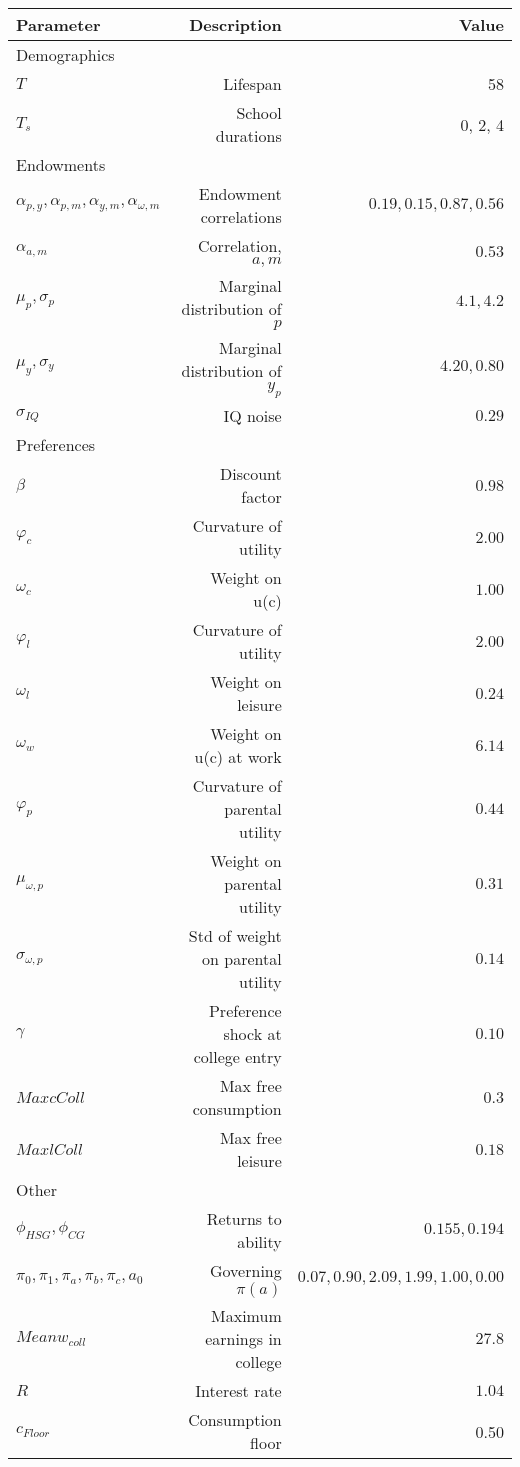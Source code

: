 \begin{tabular}{lrr}
\hline
Parameter & Description  & Value  \\
\hline
Demographics &   &   \\
$T$ & Lifespan  & 58  \\
$T_{s}$ & School durations  & 0, 2, 4  \\
Endowments &   &   \\
$\alpha_{p,y}, \alpha_{p,m}, \alpha_{y,m}, \alpha_{\omega,m}$ & Endowment correlations  & $0.19, 0.15, 0.87, 0.56$  \\
$\alpha_{a,m}$ & Correlation, $a,m$  & $0.53$  \\
$\mu_{p}, \sigma_{p}$ & Marginal distribution of $p$  & $4.1, 4.2$  \\
$\mu_{y}, \sigma_{y}$ & Marginal distribution of $y_{p}$  & $4.20, 0.80$  \\
$\sigma_{IQ}$ & IQ noise  & $0.29$  \\
Preferences &   &   \\
$\beta$ & Discount factor  & $0.98$  \\
$\varphi_{c}$ & Curvature of utility  & $2.00$  \\
$\omega_{c}$ & Weight on u(c)  & $1.00$  \\
$\varphi_{l}$ & Curvature of utility  & $2.00$  \\
$\omega_{l}$ & Weight on leisure  & $0.24$  \\
$\omega_{w}$ & Weight on u(c) at work  & $6.14$  \\
$\varphi_{p}$ & Curvature of parental utility  & $0.44$  \\
$\mu_{\omega,p}$ & Weight on parental utility  & $0.31$  \\
$\sigma_{\omega,p}$ & Std of weight on parental utility  & $0.14$  \\
$\gamma$ & Preference shock at college entry  & $0.10$  \\
$Max cColl$ & Max free consumption  & $0.3$  \\
$Max lColl$ & Max free leisure  & $0.18$  \\
Other &   &   \\
$\phi_{HSG}, \phi_{CG}$ & Returns to ability  & $0.155, 0.194$  \\
$\pi_{0}, \pi_{1}, \pi_{a}, \pi_{b}, \pi_{c}, a_{0}$ & Governing $\pi(a)$  & $0.07, 0.90, 2.09, 1.99, 1.00, 0.00$  \\
$Mean w_{coll}$ & Maximum earnings in college  & $27.8$  \\
$R$ & Interest rate  & $1.04$  \\
$c_{Floor}$ & Consumption floor  & 0.50  \\
\hline
\end{tabular}%
